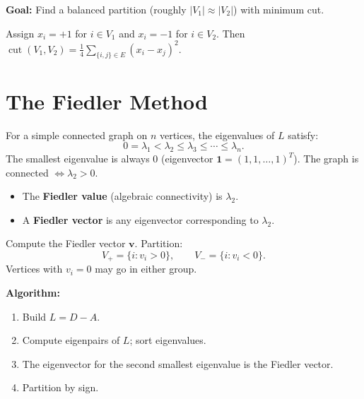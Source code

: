\textbf{Goal:} Find a balanced partition (roughly $|V_1|\approx|V_2|$) with minimum cut.

\begin{lemma}
Assign $x_i=+1$ for $i\in V_1$ and $x_i=-1$ for $i\in V_2$. Then $\operatorname{cut}(V_1,V_2)=\tfrac{1}{4}\sum_{\{i,j\}\in E}(x_i-x_j)^2$.
\end{lemma}

\section{The Fiedler Method}

\begin{fact}
For a simple connected graph on $n$ vertices, the eigenvalues of $L$ satisfy:
\[
  0 = \lambda_1 < \lambda_2 \leq \lambda_3 \leq \cdots \leq \lambda_n.
\]
The smallest eigenvalue is always 0 (eigenvector $\mathbf{1}=(1,1,\ldots,1)^T$). The graph is connected $\iff \lambda_2>0$.
\end{fact}

\begin{definition}
\begin{itemize}
  \item The \textbf{Fiedler value} (algebraic connectivity) is $\lambda_2$.
  \item A \textbf{Fiedler vector} is any eigenvector corresponding to $\lambda_2$.
\end{itemize}
\end{definition}

\begin{theorem}
Compute the Fiedler vector $\mathbf{v}$. Partition:
\[
  V_+ = \{i : v_i > 0\}, \qquad V_- = \{i : v_i < 0\}.
\]
Vertices with $v_i=0$ may go in either group.
\end{theorem}

\textbf{Algorithm:}
\begin{enumerate}
  \item Build $L=D-A$.
  \item Compute eigenpairs of $L$; sort eigenvalues.
  \item The eigenvector for the second smallest eigenvalue is the Fiedler vector.
  \item Partition by sign.
\end{enumerate}

